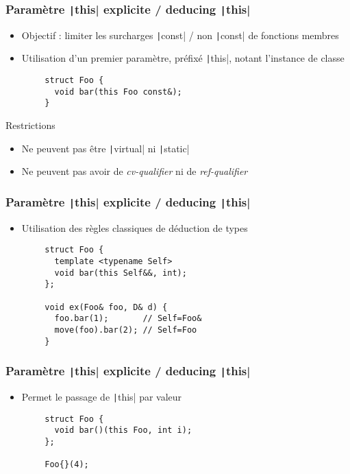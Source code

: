 \documentclass[C++.tex]{subfiles}
\begin{document}
\begin{frame}[fragile]
	\frametitle{Paramètre \texttt|this| explicite / deducing \texttt|this|}
	\begin{itemize}
		\item Objectif : limiter les surcharges \texttt|const| / non \texttt|const| de fonctions membres
		\item Utilisation d'un premier paramètre, préfixé \texttt|this|, notant l'instance de classe
	\end{itemize}

	\begin{verbatim}
		struct Foo {
		  void bar(this Foo const&);
		}
	\end{verbatim}

	\begin{alertblock}{Restrictions}
		\begin{itemize}
			\item Ne peuvent pas être \texttt|virtual| ni \texttt|static|
			\item Ne peuvent pas avoir de \textit{cv-qualifier} ni de \textit{ref-qualifier}
		\end{itemize}
	\end{alertblock}
\end{frame}

\begin{frame}[fragile]
	\frametitle{Paramètre \texttt|this| explicite / deducing \texttt|this|}
	\begin{itemize}
		\item Utilisation des règles classiques de déduction de types 
	\end{itemize}

	\begin{verbatim}
		struct Foo {
		  template <typename Self>
		  void bar(this Self&&, int);
		};

		void ex(Foo& foo, D& d) {
		  foo.bar(1);       // Self=Foo&
		  move(foo).bar(2); // Self=Foo
		}
	\end{verbatim}
\end{frame}

\begin{frame}[fragile]
	\frametitle{Paramètre \texttt|this| explicite / deducing \texttt|this|}
	\begin{itemize}
		\item Permet le passage de \texttt|this| par valeur
	\end{itemize}

	\begin{verbatim}
		struct Foo {
		  void bar()(this Foo, int i);
		};

		Foo{}(4);
	\end{verbatim}
\end{frame}
\end{document}
